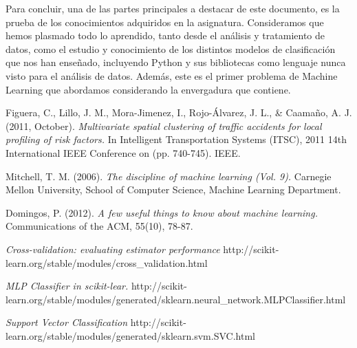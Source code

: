 \documentclass[journal,twoside]{JoPhA}
\begin{document}
Para concluir, una de las partes principales a destacar de este documento, es la prueba de los conocimientos adquiridos en la asignatura. Consideramos que hemos plasmado todo lo aprendido, tanto desde el análisis y tratamiento de datos, como el estudio y conocimiento de los distintos modelos de clasificación que nos han enseñado, incluyendo Python y sus bibliotecas como lenguaje nunca visto para el análisis de datos. Además, este es el primer problema de Machine Learning que abordamos considerando la envergadura que contiene.

\begin{thebibliography}{1}

Figuera, C., Lillo, J. M., Mora-Jimenez, I., Rojo-Álvarez, J. L., \& Caamaño, A. J. (2011, October). \emph{Multivariate spatial clustering of traffic accidents for local profiling of risk factors.} In Intelligent Transportation Systems (ITSC), 2011 14th International IEEE Conference on (pp. 740-745). IEEE.

Mitchell, T. M. (2006). \emph{The discipline of machine learning (Vol. 9).} Carnegie Mellon University, School of Computer Science, Machine Learning Department.

Domingos, P. (2012). \emph{A few useful things to know about machine learning.} Communications of the ACM, 55(10), 78-87.

\emph{Cross-validation: evaluating estimator performance} http://scikit-learn.org/stable/modules/cross\_validation.html

\emph{MLP Classifier in scikit-lear.}
http://scikit-learn.org/stable/modules/generated/sklearn.neural\_network.MLPClassifier.html

\emph{Support Vector Classification}
http://scikit-learn.org/stable/modules/generated/sklearn.svm.SVC.html

\end{thebibliography}
\end{document}
